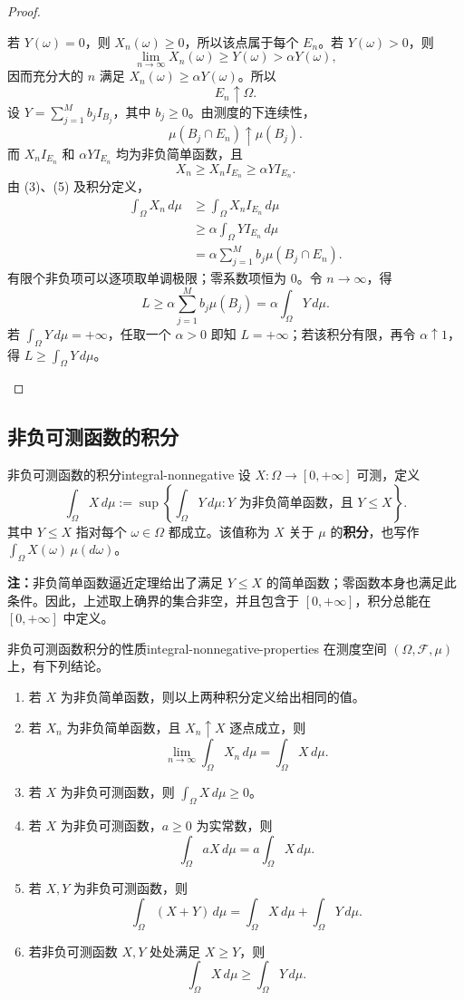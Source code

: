 \begin{proof}
\begin{enumerate}
若 $Y(\omega)=0$，则 $X_n(\omega)\geq0$，所以该点属于每个 $E_n$。若 $Y(\omega)>0$，则
\[
\lim_{n\to\infty}X_n(\omega)\geq Y(\omega)>\alpha Y(\omega),
\]
因而充分大的 $n$ 满足 $X_n(\omega)\geq\alpha Y(\omega)$。所以
\[
E_n\uparrow\Omega.
\]
设 $Y=\sum_{j=1}^M b_jI_{B_j}$，其中 $b_j\geq0$。由测度的下连续性，
\[
\mu(B_j\cap E_n)\uparrow\mu(B_j).
\]
而 $X_nI_{E_n}$ 和 $\alpha YI_{E_n}$ 均为非负简单函数，且
\[
X_n\geq X_nI_{E_n}\geq\alpha YI_{E_n}.
\]
由 (3)、(5) 及积分定义，
\begin{align*}
\int_\Omega X_n\,d\mu
&\geq\int_\Omega X_nI_{E_n}\,d\mu\\
&\geq\alpha\int_\Omega YI_{E_n}\,d\mu\\
&=\alpha\sum_{j=1}^M b_j\mu(B_j\cap E_n).
\end{align*}
有限个非负项可以逐项取单调极限；零系数项恒为 $0$。令 $n\to\infty$，得
\[
L\geq\alpha\sum_{j=1}^M b_j\mu(B_j)
=\alpha\int_\Omega Y\,d\mu.
\]
若 $\int_\Omega Y\,d\mu=+\infty$，任取一个 $\alpha>0$ 即知 $L=+\infty$；若该积分有限，再令 $\alpha\uparrow1$，得 $L\geq\int_\Omega Y\,d\mu$。
\end{enumerate}
\end{proof}

\subsection*{非负可测函数的积分}

\begin{mydefinition}{非负可测函数的积分}{integral-nonnegative}
设 $X:\Omega\to[0,+\infty]$ 可测，定义
\[
\int_\Omega X\,d\mu
:=
\sup\left\{
\int_\Omega Y\,d\mu:
Y\text{ 为非负简单函数，且 }Y\leq X
\right\}.
\]
其中 $Y\leq X$ 指对每个 $\omega\in\Omega$ 都成立。该值称为 $X$ 关于 $\mu$ 的\textbf{积分}，也写作 $\int_\Omega X(\omega)\,\mu(d\omega)$。
\end{mydefinition}

\textbf{注：}\quad 非负简单函数逼近定理给出了满足 $Y\leq X$ 的简单函数；零函数本身也满足此条件。因此，上述取上确界的集合非空，并且包含于 $[0,+\infty]$，积分总能在 $[0,+\infty]$ 中定义。

\begin{proposition}{非负可测函数积分的性质}{integral-nonnegative-properties}
在测度空间 $(\Omega,\mathcal F,\mu)$ 上，有下列结论。
\begin{enumerate}
\item 若 $X$ 为非负简单函数，则以上两种积分定义给出相同的值。
\item 若 $X_n$ 为非负简单函数，且 $X_n\uparrow X$ 逐点成立，则
\[
\lim_{n\to\infty}\int_\Omega X_n\,d\mu=\int_\Omega X\,d\mu.
\]
\item 若 $X$ 为非负可测函数，则 $\int_\Omega X\,d\mu\geq0$。
\item 若 $X$ 为非负可测函数，$a\geq0$ 为实常数，则
\[
\int_\Omega aX\,d\mu=a\int_\Omega X\,d\mu.
\]
\item 若 $X,Y$ 为非负可测函数，则
\[
\int_\Omega(X+Y)\,d\mu
=\int_\Omega X\,d\mu+\int_\Omega Y\,d\mu.
\]
\item 若非负可测函数 $X,Y$ 处处满足 $X\geq Y$，则
\[
\int_\Omega X\,d\mu\geq\int_\Omega Y\,d\mu.
\]
\end{enumerate}
\end{proposition}

